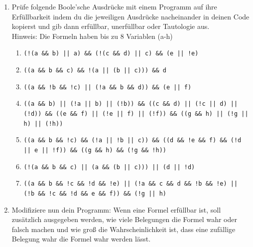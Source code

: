 \begin{enumerate}
    \item Prüfe folgende Boole'sche Ausdrücke mit einem Programm auf ihre Erfüllbarkeit indem du die jeweiligen Ausdrücke nacheinander in deinen Code kopierst und gib dann erfüllbar, unerfüllbar oder Tautologie aus.\\
    Hinweis: Die Formeln haben bis zu 8 Variablen (a-h)
          \begin{enumerate}
              \item \begin{ausgabe} \texttt{(!(a \&\& b) || a) \&\& (!(c \&\& d) || c) \&\& (e || !e)} \end{ausgabe} %
              \item \begin{ausgabe} \texttt{((a \&\& b \&\& c) \&\& !(a || (b || c))) \&\& d} \end{ausgabe} %
              \item \begin{ausgabe} \texttt{((a \&\& !b \&\& !c) || (!a \&\& b \&\& d)) \&\& (e || f)} \end{ausgabe} %
              \item \begin{ausgabe} \texttt{((a \&\& b) || (!a || b) || (!b)) \&\&
                            ((c \&\& d) || (!c || d) || (!d)) \&\&
                            ((e \&\& f) || (!e || f) || (!f)) \&\&
                            ((g \&\& h) || (!g || h) || (!h))}
                    \end{ausgabe} %
              \item \begin{ausgabe} \texttt{((a \&\& b \&\& !c) \&\& (!a || !b || c)) \&\&
                            ((d \&\& !e \&\& f) \&\& (!d || e || !f)) \&\&
                            ((g \&\& h) \&\& (!g \&\& !h))}
                    \end{ausgabe} %
              \item \begin{ausgabe} \texttt{(!(a \&\& b \&\& c) || (a \&\& (b || c))) || (d || !d)} \end{ausgabe} %
              \item \begin{ausgabe} \texttt{((a \&\& b \&\& !c \&\& !d \&\& !e) ||
                            (!a \&\& c \&\& d \&\& !b \&\& !e) ||
                            (!b \&\& !c \&\& !d \&\& e \&\& f)) \&\& (!g || h)}
                    \end{ausgabe} %
        \end{enumerate}
        \item Modifiziere nun dein Programm: Wenn eine Formel erfüllbar ist, soll zusätzlich ausgegeben werden, wie viele Belegungen die Formel wahr oder falsch machen und wie groß die Wahrscheinlichkeit ist, dass eine zufällige Belegung wahr die Formel wahr werden lässt.
    \end{enumerate}

